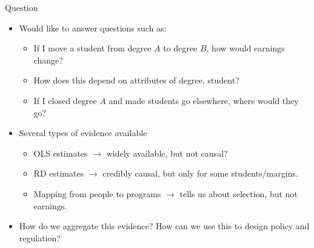 \documentclass[table,10pt]{beamer}
\begin{document}
\begin{frame}{Question }

\begin{itemize}

\item<2> Would like to answer questions such as:

\begin{itemize}
\item<2> If I move a student from degree $A$ to degree $B$, how would earnings change? \medskip
\item<2> How does this depend on attributes of degree, student?\medskip
\item<2> If I closed degree $A$ and made students go elsewhere, where would they go?
\end{itemize}

\medskip

\item<3> Several types of evidence available
\begin{itemize}
\item<3> OLS estimates $\rightarrow$ widely available, but not causal?
\medskip

\item<3> RD estimates $\rightarrow$ credibly causal, but only for some students/margins.
\medskip

\item<3> Mapping from people to programs  $\rightarrow$  tells us about selection, but not earnings.
\end{itemize}

\bigskip
\item<4> How do we aggregate this evidence? How can we use this to design policy and regulation?


\end{itemize}

\end{frame}
\end{document}

